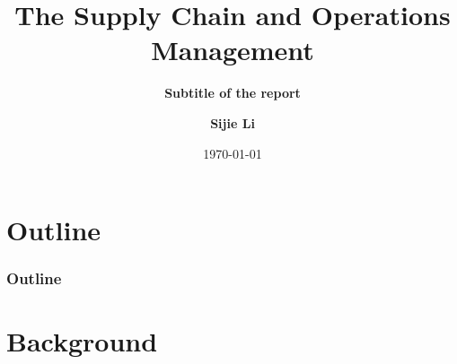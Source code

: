 \documentclass[aspectratio=169, 12pt, utf8, mathserif]{ctexbeamer} %
\begin{document}

	
\title[Week 1 Team Report]{\bf The Supply Chain and Operations Management} %
\subtitle{\bf \color{blue01} Subtitle of the report} %

\author[\href{}{}]
{
	{\songti {}  \bfseries Sijie Li}  \\ \vspace*{0.1cm}
}

\date{\today}%
	

\begin{frame}
	\maketitle
\end{frame}
	
\section*{Outline}
\begin{frame}
	\frametitle{Outline}
	\tableofcontents
\end{frame}


\section{Background}
\end{document}

